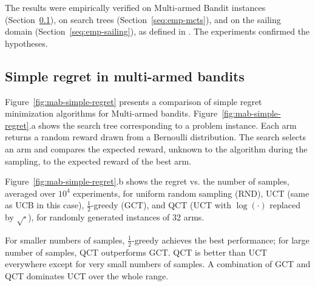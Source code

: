 \documentclass{article}
\begin{document}
The results were empirically verified on Multi-armed Bandit instances
(Section~\ref{seq:emp-mab}), on search trees
(Section~\ref{seq:emp-mcts}), and on the sailing domain
(Section~\ref{seq:emp-sailing}), as defined in \cite{Kocsis.uct}. The
experiments confirmed the hypotheses.

\subsection{Simple regret in multi-armed bandits}
\label{seq:emp-mab}

Figure~\ref{fig:mab-simple-regret} presents a comparison of simple
regret minimization algorithms for Multi-armed
bandits. Figure~\ref{fig:mab-simple-regret}.a shows the search tree
corresponding to a problem instance. Each arm returns a random reward
drawn from a Bernoulli distribution. The search selects an arm
and compares the expected reward, unknown to the algorithm during the
sampling, to the expected reward of the best arm.

Figure~\ref{fig:mab-simple-regret}.b shows the regret
vs. the number of samples, averaged over $10^4$ experiments, for uniform
random sampling (RND), UCT (same as UCB in this case),
$\frac 1 2$-greedy (GCT), and QCT (UCT with $\log(\cdot)$ replaced by
$\sqrt{\cdot}$), for randomly generated instances of 32 arms. 

For smaller numbers of samples, $\frac 1 2$-greedy achieves the best
performance; for large number of samples, QCT outperforms GCT. QCT is
better than UCT everywhere except for very small numbers of samples. A
combination of GCT and QCT dominates UCT over the whole range.
\end{document}
